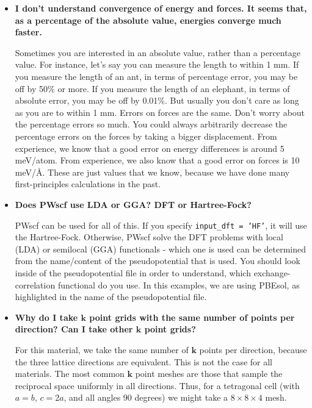 \documentclass[12pt]{article}
\begin{document}
\begin{itemize}
    \item
    {\bf I don't understand convergence of energy and forces. It seems that, as a
    percentage of the absolute value, energies converge much faster.}

    Sometimes you are interested in an absolute value, rather than a percentage
    value.
    For instance, let's say you can measure the length to within 1 mm.
    If you measure the length of an ant, in terms of percentage error, you may be
    off by 50\% or more.
    If you measure the length of an elephant, in terms of absolute error, you may
    be off by 0.01\%.
    But usually you don't care as long as you are to within 1 mm.
    Errors on forces are the same.
    Don't worry about the percentage errors so much.
    You could always arbitrarily decrease the percentage errors on the forces by
    taking a bigger displacement.
    From experience, we know that a good error on energy differences is around 5
    meV/atom.
    From experience, we also know that a good error on forces is 10 meV/\AA.
    These are just values that we know, because we have done many first-principles
    calculations in the past.
    
    \vspace{2mm}
    \item
    {\bf Does PWscf use LDA or GGA? DFT or Hartree-Fock?}

    PWscf can be used for all of this.
    If you specify {\tt input\_dft = 'HF'}, it will use the Hartree-Fock. Otherwise, PWscf solve the DFT problems with local (LDA) or semilocal (GGA) functionals - which one is used can be determined from the name/content of the pseudopotential that is used.
    You should look inside of the pseudopotential file in order to understand,
    which exchange-correlation functional do you use.
    In this examples, we are using PBEsol, as highlighted in the name of the
    pseudopotential file.


    \item
    {\bf Why do I take $\mathbf{k}$ point grids with the same number of points
    per direction? Can I take other $\mathbf{k}$ point grids?}

    For this material, we take the same number of $\mathbf{k}$ points per direction,
    because the three lattice directions are equivalent.
    This is not the case for all materials.
    The most common $\mathbf{k}$ point meshes are those that sample the reciprocal
    space uniformly in all directions.
    Thus, for a tetragonal cell (with $a=b$, $c=2a$, and all angles 90 degrees) we
    might take a $8 \times 8 \times 4$ mesh.

    \end{itemize}


\vspace{6mm}


\end{document}
